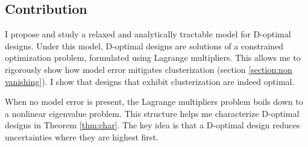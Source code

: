 \subsection{Contribution}
I propose and study a relaxed and analytically tractable model for
D-optimal designs. Under this model, D-optimal designs are solutions
of a constrained optimization problem, formulated using Lagrange
multipliers. This allows me to rigorously show how model error
mitigates clusterization (section \ref{section:non vanishing}). I show
that designs that exhibit clusterization are indeed optimal.


When no model error is present, the Lagrange multipliers problem boils
down to a nonlinear eigenvalue problem.
This structure helps me characterize D-optimal designs in Theorem
\ref{thm:char}. The key idea is that a D-optimal design reduces
uncertainties where they are highest first.


